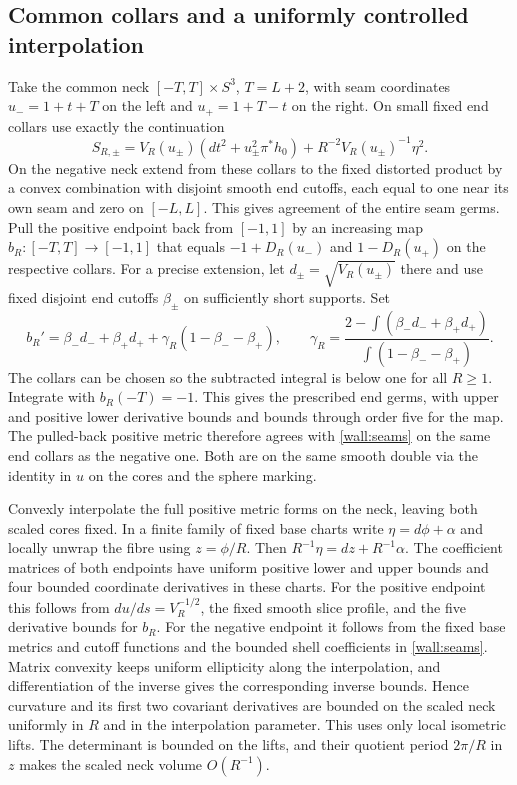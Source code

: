 \documentclass[11pt]{article}
\numberwithin{equation}{section}
\theoremstyle{definition}
\theoremstyle{remark}
\begin{document}
\subsection{Common collars and a uniformly controlled interpolation}

Take the common neck \([-T,T]\times S^3\), \(T=L+2\), with
seam coordinates \(u_-=1+t+T\) on the left and \(u_+=1+T-t\)
on the right. On small fixed end collars use exactly the continuation
\begin{equation}\label{wall:seams}
 S_{R,\pm}=V_R(u_\pm)(dt^2+u_\pm^2\pi^*h_0)
             +R^{-2}V_R(u_\pm)^{-1}\eta^2.
\end{equation}
On the negative neck extend from these collars to the fixed
distorted product by a convex combination with disjoint smooth
end cutoffs, each equal to one near its own seam and zero on
\([-L,L]\). This gives agreement of the entire seam germs.
Pull the positive endpoint back from \([-1,1]\) by an increasing
map \(b_R:[-T,T]\to[-1,1]\) that equals
\(-1+D_R(u_-)\) and \(1-D_R(u_+)\) on the respective collars.
For a precise extension, let \(d_\pm=\sqrt{V_R(u_\pm)}\) there and
use fixed disjoint end cutoffs \(\beta_\pm\) on sufficiently
short supports. Set
\[
 b_R'=\beta_-d_-+\beta_+d_++\gamma_R(1-\beta_--\beta_+),
 \qquad
 \gamma_R=\frac{2-\int(\beta_-d_-+\beta_+d_+)}
                 {\int(1-\beta_--\beta_+)}.
\]
The collars can be chosen so the subtracted integral is below one
for all \(R\ge1\). Integrate with \(b_R(-T)=-1\). This gives the
prescribed end germs, with upper and positive lower derivative
bounds and bounds through order five for the map. The pulled-back
positive metric therefore agrees with \eqref{wall:seams} on the same
end collars as the negative one. Both are on the same smooth double
via the identity in \(u\) on the cores and the sphere marking.

Convexly interpolate the full positive metric forms on the neck,
leaving both scaled cores fixed. In a finite family of fixed base
charts write \(\eta=d\phi+\alpha\) and locally unwrap the fibre using
\(z=\phi/R\). Then \(R^{-1}\eta=dz+R^{-1}\alpha\). The coefficient
matrices of both endpoints have uniform positive lower and upper
bounds and four bounded coordinate derivatives in these charts.
For the positive endpoint this follows from \(du/ds=V_R^{-1/2}\),
the fixed smooth slice profile, and the five derivative bounds
for \(b_R\). For the negative endpoint it follows from the fixed
base metrics and cutoff functions and the bounded shell
coefficients in \eqref{wall:seams}. Matrix convexity keeps
uniform ellipticity along the interpolation, and differentiation
of the inverse gives the corresponding inverse bounds. Hence
curvature and its first two covariant derivatives are bounded
on the scaled neck uniformly in \(R\) and in the interpolation
parameter. This uses only local isometric lifts. The determinant
is bounded on the lifts, and their quotient period \(2\pi/R\)
in \(z\) makes the scaled neck volume \(O(R^{-1})\).
\end{document}
